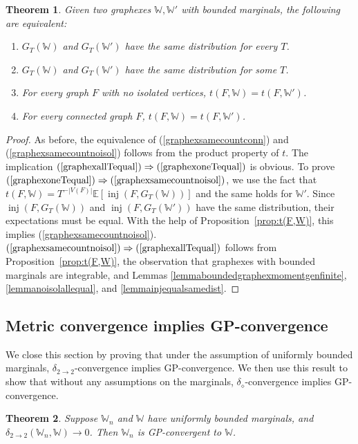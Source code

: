 \documentclass{amsart}
\numberwithin{equation}{section}
\numberwithin{figure}{section}
\newtheorem{theorem}{Theorem}[section]
\theoremstyle{definition}
\theoremstyle{remark}
\DeclareMathOperator{\inj}{inj}
\newcommand{\EE}{\mathbb{E}}
\newcommand{\cW}{\mathbb{W}}
\newcommand{\deltt}{\delta_{2\to 2}}
\def\delGP{\delta_\diamond}
\begin{document}
\begin{theorem} \label{theoremgraphexexpsameequiv}
Given two graphexes $\cW,\cW'$ with bounded marginals, the following are
equivalent:
\begin{enumerate}
\item $G_T(\cW)$ and $G_T(\cW')$ have the same distribution for every $T$. \label{graphexallTequal}
\item $G_T(\cW)$ and $G_T(\cW')$ have the same distribution for some $T$. \label{graphexoneTequal}
\item For every graph $F$ with no isolated vertices, $t(F,\cW)= t(F,\cW')$. \label{graphexsamecountnoisol}
\item For every connected graph $F$, $t(F,\cW) =t(F,\cW')$. \label{graphexsamecountconn}
\end{enumerate}
\end{theorem}
\begin{proof}
As before, the equivalence of (\ref{graphexsamecountconn}) and
(\ref{graphexsamecountnoisol}) follows from the product property of $t$. The
implication $(\ref{graphexallTequal}) \Rightarrow (\ref{graphexoneTequal})$
is obvious. To prove $(\ref{graphexoneTequal}) \Rightarrow
(\ref{graphexsamecountnoisol})$, we use the fact that
$t(F,\cW)=T^{-|V(F)|}\EE[\inj(F,G_T(\cW))]$ and the same holds for $\cW'$.
Since $\inj(F,G_T(\cW))$ and $\inj(F,G_T(\cW'))$ have the same distribution,
their expectations must be equal. With the help of
Proposition~\ref{prop:t(F,W)}, this implies (\ref{graphexsamecountnoisol}).
$(\ref{graphexsamecountnoisol}) \Rightarrow (\ref{graphexallTequal})$ follows
from Proposition~\ref{prop:t(F,W)}, the observation that graphexes with
bounded marginals are integrable, and Lemmas
\ref{lemmaboundedgraphexmomentgenfinite}, \ref{lemmanoisolallequal}, and
\ref{lemmainjequalsamedist}.
\end{proof}

\subsection{Metric convergence implies GP-convergence} \label{sec:metric-implies-GP}

We close this section by proving that under the assumption of uniformly
bounded marginals, $\deltt$-convergence implies GP-convergence. We then use
this result to show that without any assumptions on the marginals,
$\delGP$-convergence implies GP-convergence.

\begin{theorem}\label{thm:deltt-implies-GPconv}
Suppose $\cW_n$ and $\cW$ have uniformly bounded marginals, and
$\deltt(\cW_n,\cW) \rightarrow 0$. Then $\cW_n$ is GP-convergent to $\cW$.
\end{theorem}
\end{document}
